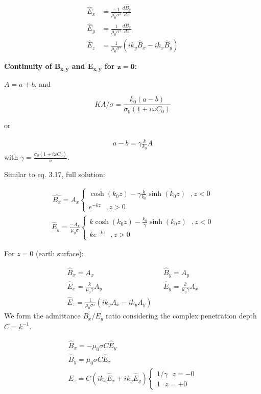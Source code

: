  \begin{align*}
 \hat{E}_x&=\frac{-1}{\mu_0\sigma^\star}\frac{d\hat{B}_y}{dz}\\
 \hat{E}_y&=\frac{1}{\mu_0\sigma^\star}\frac{d\hat{B}_x}{dz}\\
 \hat{E}_z&=\frac{1}{\mu_0\sigma^\star}(ik_y\hat{B}_x-ik_x\hat{B}_y)
 \end{align*}
 
 \textbf{Continuity of $\mathbf{B_{x,y}}$ and $\mathbf{E_{x,y}}$ for $\mathbf{z=0}$:}
 
 $A=a+b$, and 
 
 \begin{equation}
 KA/\sigma=\frac{k_0(a-b)}{\sigma_0(1+i\omega C_0)}
 \end{equation}
 
or

\begin{align*}
a-b=\gamma\frac{k}{k_0}A 
\end{align*}
with $\gamma=\frac{\sigma_0(1+i\omega C_0)}{\sigma}$.

Similar to eq. 3.17, full solution:

\begin{align*}
\hat{B_x}=A_x\begin{cases}
\cosh(k_0z)-\gamma\frac{k}{k_0}\sinh(k_0z) ~~~, z<0\\
e^{-kz} ~~~,z>0
\end{cases}
\end{align*}
\begin{align*}
\hat{E}_y=\frac{-A_x}{\mu_0\sigma}\begin{cases}
k\cosh(k_0z)-\frac{k_0}{\gamma}\sinh(k_0z) ~~~, z<0\\
ke^{-kz} ~~~,z>0
\end{cases}
\end{align*}

For $z=0$ (earth surface):

\begin{align*}
\hat{B}_x=A_x && \hat{B}_y=A_y\\
\hat{E}_x=\frac{k}{\mu_0\gamma}A_y && \hat{E}_y=\frac{k}{\mu_0\gamma}A_x\\
\hat{E}_z=\frac{1}{\mu_0\sigma^\star}(ik_yA_x-ik_yA_y)
\end{align*}
We form the admittance $B_x/E_y$ ratio considering the complex penetration depth $C=k^{-1}$.

\begin{align*}
\hat{B}_x=-\mu_0\sigma C\hat{E}_y\\
\hat{B}_y=\mu_0\sigma C\hat{E}_x\\
\hat{E}_z=C(ik_x\hat{E}_x+ik_y\hat{E}_y)\begin{cases}
1/\gamma ~~~ z=-0\\
1 ~~~ z=+0
\end{cases}
\end{align*}

